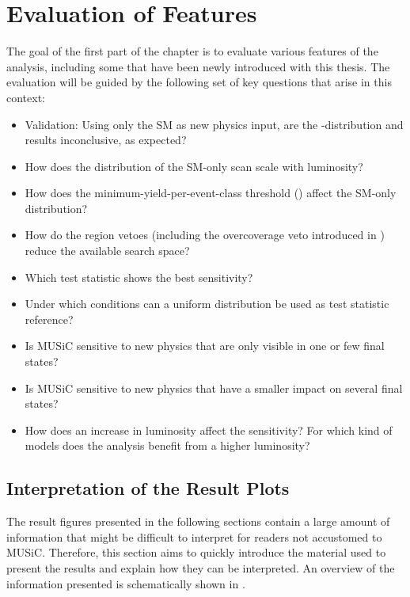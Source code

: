 \section{Evaluation of Features}
The goal of the first part of the chapter is to evaluate various features of the analysis, including some that have been newly introduced with this thesis. The evaluation will be guided by the following set of key questions that arise in this context:
\begin{itemize}
    \item Validation: Using only the \ac{SM} as new physics input, are the \ptilde-distribution and \phat results inconclusive, as expected?
    \item How does the \ptilde distribution of the \ac{SM}-only scan scale with luminosity?
    \item How does the minimum-yield-per-event-class threshold () affect the \ac{SM}-only distribution?
    \item How do the region vetoes (including the overcoverage veto introduced in ) reduce the available search space?
    \item Which test statistic \TSphat shows the best sensitivity?
    \item Under which conditions can a uniform distribution be used as test statistic reference?
    \item Is \ac{MUSiC} sensitive to new physics that are only visible in one or few final states?
    \item Is \ac{MUSiC} sensitive to new physics that have a smaller impact on several final states?    
    \item How does an increase in luminosity affect the sensitivity? For which kind of models does the analysis benefit from a higher luminosity?
\end{itemize}

\subsection{Interpretation of the Result Plots}
\label{sec:how_to_read_plots}

The result figures presented in the following sections contain a large amount of information that might be difficult to interpret for readers not accustomed to \ac{MUSiC}. Therefore, this section aims to quickly introduce the material used to present the results and explain how they can be interpreted. An overview of the information presented is schematically shown in .

